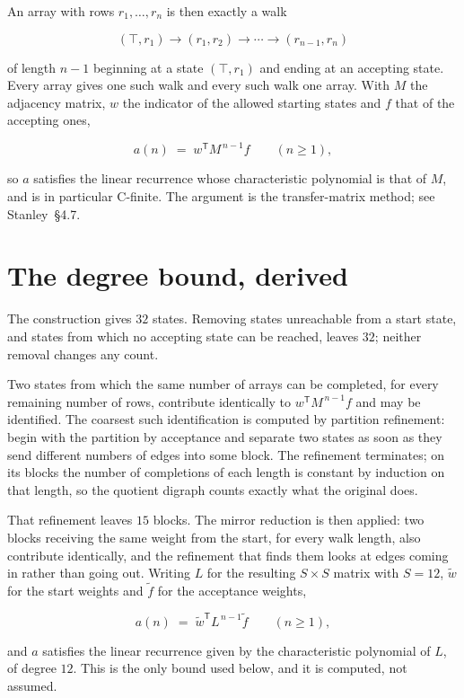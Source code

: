\documentclass[11pt]{article}
\theoremstyle{definition}
\begin{document}
An array with rows $r_1,\dots,r_n$ is then exactly a walk

\[(\top,r_1) \to (r_1,r_2) \to \cdots \to (r_{n-1},r_n)\]

of length $n-1$ beginning at a state $(\top,r_1)$ and ending at an accepting state. Every array gives one such walk and every such walk one array. With $M$ the adjacency matrix, $w$ the indicator of the allowed starting states and $f$ that of the accepting ones,

\[a(n) \;=\; w^{\mathsf T} M^{\,n-1} f \qquad (n \ge 1),\]

so $a$ satisfies the linear recurrence whose characteristic polynomial is that of $M$, and is in particular C-finite. The argument is the transfer-matrix method; see Stanley~\S4.7.

\section{The degree bound, derived}

The construction gives $32$ states. Removing states unreachable from a start state, and states from which no accepting state can be reached, leaves $32$; neither removal changes any count.

Two states from which the same number of arrays can be completed, for every remaining number of rows, contribute identically to $w^{\mathsf T}M^{\,n-1}f$ and may be identified. The coarsest such identification is computed by partition refinement: begin with the partition by acceptance and separate two states as soon as they send different numbers of edges into some block. The refinement terminates; on its blocks the number of completions of each length is constant by induction on that length, so the quotient digraph counts exactly what the original does.

That refinement leaves $15$ blocks. The mirror reduction is then applied: two blocks receiving the same weight from the start, for every walk length, also contribute identically, and the refinement that finds them looks at edges coming in rather than going out. Writing $L$ for the resulting $S \times S$ matrix with $S = 12$, $\tilde w$ for the start weights and $\tilde f$ for the acceptance weights,

\[a(n) \;=\; \tilde w^{\mathsf T} L^{\,n-1} \tilde f \qquad (n \ge 1),\]

and $a$ satisfies the linear recurrence given by the characteristic polynomial of $L$, of degree $12$. This is the only bound used below, and it is computed, not assumed.
\end{document}

